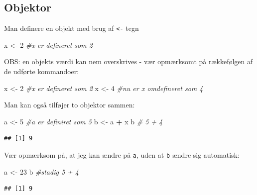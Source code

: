 \documentclass[
]{book}
\newenvironment{Shaded}{\begin{snugshade}}{\end{snugshade}}
\newcommand{\CommentTok}[1]{\textcolor[rgb]{0.56,0.35,0.01}{\textit{#1}}}
\newcommand{\DecValTok}[1]{\textcolor[rgb]{0.00,0.00,0.81}{#1}}
\newcommand{\NormalTok}[1]{#1}
\newcommand{\OtherTok}[1]{\textcolor[rgb]{0.56,0.35,0.01}{#1}}
\newcommand{\SpecialCharTok}[1]{\textcolor[rgb]{0.81,0.36,0.00}{\textbf{#1}}}
\theoremstyle{definition}
\theoremstyle{definition}
\theoremstyle{definition}
\theoremstyle{definition}
\theoremstyle{remark}
\begin{document}
\subsection{Objektor}\label{objektor}

Man definere en objekt med brug af \texttt{\textless{}-} tegn

\begin{Shaded}
\begin{Highlighting}[]
\NormalTok{x }\OtherTok{\textless{}{-}} \DecValTok{2} \CommentTok{\#x er defineret som 2}
\end{Highlighting}
\end{Shaded}

OBS: en objekts værdi kan nem overskrives - vær opmærksomt på rækkefølgen af de udførte kommandoer:

\begin{Shaded}
\begin{Highlighting}[]
\NormalTok{x }\OtherTok{\textless{}{-}} \DecValTok{2} \CommentTok{\#x er defineret som 2}
\NormalTok{x }\OtherTok{\textless{}{-}} \DecValTok{4} \CommentTok{\#nu er x omdefineret som 4}
\end{Highlighting}
\end{Shaded}

Man kan også tilføjer to objektor sammen:

\begin{Shaded}
\begin{Highlighting}[]
\NormalTok{a }\OtherTok{\textless{}{-}} \DecValTok{5} \CommentTok{\#a er definiret som 5}
\NormalTok{b }\OtherTok{\textless{}{-}}\NormalTok{ a }\SpecialCharTok{+}\NormalTok{ x}
\NormalTok{b }\CommentTok{\# 5 + 4}
\end{Highlighting}
\end{Shaded}

\begin{verbatim}
## [1] 9
\end{verbatim}

Vær opmærksom på, at jeg kan ændre på \texttt{a}, uden at \texttt{b} ændre sig automatisk:

\begin{Shaded}
\begin{Highlighting}[]
\NormalTok{a }\OtherTok{\textless{}{-}} \DecValTok{23}
\NormalTok{b }\CommentTok{\#stadig 5 + 4}
\end{Highlighting}
\end{Shaded}

\begin{verbatim}
## [1] 9
\end{verbatim}
\end{document}
